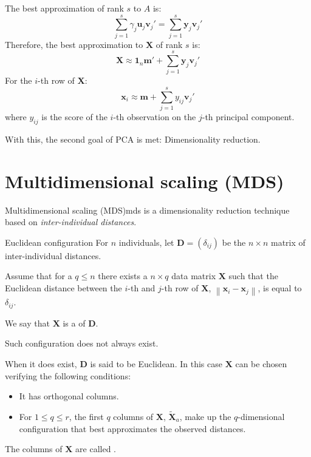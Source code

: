 The best approximation of rank $s$ to $A$ is:
\begin{equation*}
	\sum_{j=1}^s \gamma_j \boldsymbol{u}_j \boldsymbol{v}_j' = \sum_{j=1}^s \boldsymbol{y}_j \boldsymbol{v}_j'
\end{equation*}
Therefore, the best approximation to $\boldsymbol{X}$ of rank $s$ is:
\begin{equation*}
	\boldsymbol{X} \approx \boldsymbol 1_n \boldsymbol m ' + \sum_{j=1}^s \boldsymbol{y}_j \boldsymbol{v}_j'
\end{equation*}
For the $i$-th row of $\boldsymbol{X}$:
\begin{equation*}
	\boldsymbol{x}_i \approx \boldsymbol{m} + \sum_{j=1}^s y_{ij} \boldsymbol{v}_j'
\end{equation*}
where $y_{ij}$ is the score of the $i$-th observation on the $j$-th principal component.

\begin{note}
	With this, the second goal of PCA is met: Dimensionality reduction.
\end{note}

\section{Multidimensional scaling (MDS)}

\begin{definition}{Multidimensional scaling (MDS)}{mds}
	is a dimensionality reduction technique based on \emph{inter-individual distances}.
\end{definition}

\begin{definition}{Euclidean configuration}{}
	For $n$ individuals, let $\boldsymbol{D} = (\delta_{ij})$ be the $n \times n$ matrix of inter-individual
	distances.

	Assume that for a $q \leq n$ there exists a $n \times q$ data matrix $\boldsymbol{X}$ such that
	the Euclidean distance between the $i$-th and $j$-th row of $\boldsymbol{X}$,
	$\left\lVert \boldsymbol{x}_i - \boldsymbol{x}_j \right\rVert$, is equal to $\delta_{ij}$.

	We say that $\boldsymbol{X}$ is a  of $\boldsymbol{D}$.
	\tcblower
	\begin{note}
		Such configuration does not always exist.
	\end{note}
\end{definition}

When it does exist, $\boldsymbol{D}$ is said to be Euclidean. In this
case $\boldsymbol{X}$ can be chosen verifying the following conditions:
\begin{itemize}
	\item It has orthogonal columns.
	\item For $1 \leq q \leq r$, the first $q$ columns of $\boldsymbol{X}$,
	      $\boldsymbol{\tilde{X}}_a$, make up the $q$-dimensional configuration that
	      best approximates the observed distances.
\end{itemize}
The columns of $\boldsymbol{X}$ are called .

